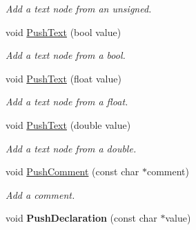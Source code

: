 \begin{DoxyCompactItemize}
\begin{DoxyCompactList}\small\item\em Add a text node from an unsigned. \end{DoxyCompactList}\item 
void \hyperlink{classtinyxml2_1_1XMLPrinter_a4390e5fa1ed05189a8686647345ab29f}{Push\+Text} (bool value)\hypertarget{classtinyxml2_1_1XMLPrinter_a4390e5fa1ed05189a8686647345ab29f}{}\label{classtinyxml2_1_1XMLPrinter_a4390e5fa1ed05189a8686647345ab29f}

\begin{DoxyCompactList}\small\item\em Add a text node from a bool. \end{DoxyCompactList}\item 
void \hyperlink{classtinyxml2_1_1XMLPrinter_a1dbb1390e829d0673af66b9cd1928bd7}{Push\+Text} (float value)\hypertarget{classtinyxml2_1_1XMLPrinter_a1dbb1390e829d0673af66b9cd1928bd7}{}\label{classtinyxml2_1_1XMLPrinter_a1dbb1390e829d0673af66b9cd1928bd7}

\begin{DoxyCompactList}\small\item\em Add a text node from a float. \end{DoxyCompactList}\item 
void \hyperlink{classtinyxml2_1_1XMLPrinter_aa715302dfc09473c77c853cbd5431965}{Push\+Text} (double value)\hypertarget{classtinyxml2_1_1XMLPrinter_aa715302dfc09473c77c853cbd5431965}{}\label{classtinyxml2_1_1XMLPrinter_aa715302dfc09473c77c853cbd5431965}

\begin{DoxyCompactList}\small\item\em Add a text node from a double. \end{DoxyCompactList}\item 
void \hyperlink{classtinyxml2_1_1XMLPrinter_afc8416814219591c2fd5656e0c233140}{Push\+Comment} (const char $\ast$comment)\hypertarget{classtinyxml2_1_1XMLPrinter_afc8416814219591c2fd5656e0c233140}{}\label{classtinyxml2_1_1XMLPrinter_afc8416814219591c2fd5656e0c233140}

\begin{DoxyCompactList}\small\item\em Add a comment. \end{DoxyCompactList}\item 
void {\bfseries Push\+Declaration} (const char $\ast$value)\hypertarget{classtinyxml2_1_1XMLPrinter_a2fe3565e262594efc6c0276723c83fe7}{}\label{classtinyxml2_1_1XMLPrinter_a2fe3565e262594efc6c0276723c83fe7}


\end{DoxyCompactItemize}

